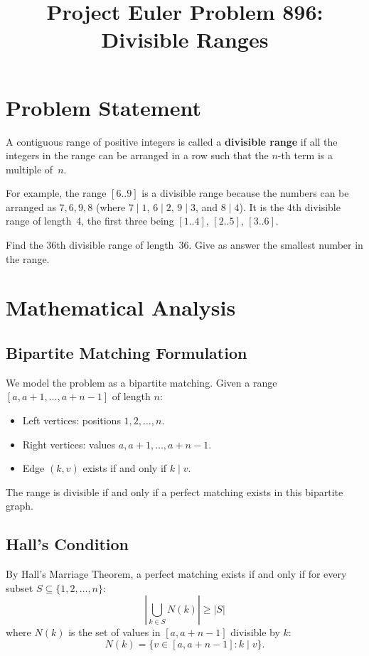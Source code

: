 \documentclass[12pt]{article}
\title{Project Euler Problem 896: Divisible Ranges}
\author{}
\date{}
\begin{document}
\maketitle

\section{Problem Statement}

A contiguous range of positive integers is called a \textbf{divisible range} if all the integers in the range can be arranged in a row such that the $n$-th term is a multiple of~$n$.

For example, the range $[6..9]$ is a divisible range because the numbers can be arranged as $7, 6, 9, 8$ (where $7 \mid 1$, $6 \mid 2$, $9 \mid 3$, and $8 \mid 4$). It is the 4th divisible range of length~4, the first three being $[1..4]$, $[2..5]$, $[3..6]$.

Find the 36th divisible range of length~36. Give as answer the smallest number in the range.

\section{Mathematical Analysis}

\subsection{Bipartite Matching Formulation}

We model the problem as a bipartite matching. Given a range $[a, a+1, \ldots, a+n-1]$ of length $n$:
\begin{itemize}
    \item Left vertices: positions $1, 2, \ldots, n$.
    \item Right vertices: values $a, a+1, \ldots, a+n-1$.
    \item Edge $(k, v)$ exists if and only if $k \mid v$.
\end{itemize}

The range is divisible if and only if a perfect matching exists in this bipartite graph.

\subsection{Hall's Condition}

By Hall's Marriage Theorem, a perfect matching exists if and only if for every subset $S \subseteq \{1, 2, \ldots, n\}$:
\[
\left| \bigcup_{k \in S} N(k) \right| \geq |S|
\]
where $N(k)$ is the set of values in $[a, a+n-1]$ divisible by $k$:
\[
N(k) = \{ v \in [a, a+n-1] : k \mid v \} .
\]
\end{document}
